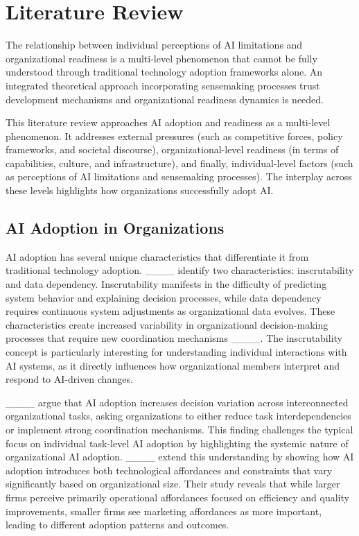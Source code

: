 \section{Literature Review}
The relationship between individual perceptions of AI limitations and organizational readiness is a multi-level phenomenon that cannot be fully understood through traditional technology adoption frameworks alone. An integrated theoretical approach incorporating sensemaking processes trust development mechanisms and organizational readiness dynamics is needed.

This literature review approaches AI adoption and readiness as a multi-level phenomenon. It addresses external pressures (such as competitive forces, policy frameworks, and societal discourse), organizational-level readiness (in terms of capabilities, culture, and infrastructure), and finally, individual-level factors (such as perceptions of AI limitations and sensemaking processes). The interplay across these levels highlights how organizations successfully adopt AI.


\subsection{AI Adoption in Organizations}

AI adoption has several unique characteristics that differentiate it from traditional technology adoption. ____ identify two characteristics: inscrutability and data dependency. Inscrutability manifests in the difficulty of predicting system behavior and explaining decision processes, while data dependency requires continuous system adjustments as organizational data evolves. These characteristics create increased variability in organizational decision-making processes that require new coordination mechanisms ____. The inscrutability concept is particularly interesting for understanding individual interactions with AI systems, as it directly influences how organizational members interpret and respond to AI-driven changes.

____ argue that AI adoption increases decision variation across interconnected organizational tasks, asking organizations to either reduce task interdependencies or implement strong coordination mechanisms. This finding challenges the typical focus on individual task-level AI adoption by highlighting the systemic nature of organizational AI adoption. ____ extend this understanding by showing how AI adoption introduces both technological affordances and constraints that vary significantly based on organizational size. Their study reveals that while larger firms perceive primarily operational affordances focused on efficiency and quality improvements, smaller firms see marketing affordances as more important, leading to different adoption patterns and outcomes.

